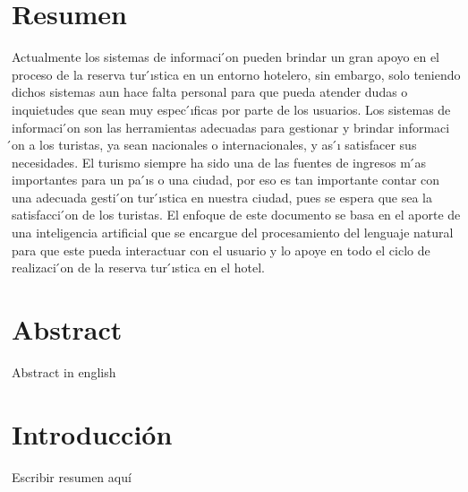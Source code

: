 \documentclass[12pt,a4paper,oneside]{report}
\begin{document}

\chapter*{\centering \large Resumen} 
{Actualmente los sistemas de informaci ́on pueden brindar un gran apoyo en el proceso de la
reserva tur ́ıstica en un entorno hotelero, sin embargo, solo teniendo dichos sistemas aun hace falta
personal para que pueda atender dudas o inquietudes que sean muy espec ́ıficas por parte de los
usuarios. Los sistemas de informaci ́on son las herramientas adecuadas para gestionar y brindar
informaci ́on a los turistas, ya sean nacionales o internacionales, y as ́ı satisfacer sus necesidades. El
turismo siempre ha sido una de las fuentes de ingresos m ́as importantes para un pa ́ıs o una ciudad,
por eso es tan importante contar con una adecuada gesti ́on tur ́ıstica en nuestra ciudad, pues se
espera que sea la satisfacci ́on de los turistas. El enfoque de este documento se basa en el aporte
de una inteligencia artificial que se encargue del procesamiento del lenguaje natural para que este
pueda interactuar con el usuario y lo apoye en todo el ciclo de realizaci ́on de la reserva tur ́ıstica
en el hotel.}\\[0.5cm]



\chapter*{\centering \large Abstract} 
{Abstract in english}\\[0.5cm]

\chapter*{\centering \large Introducción} 
{Escribir resumen aquí}\\[0.5cm]
\end{document}
